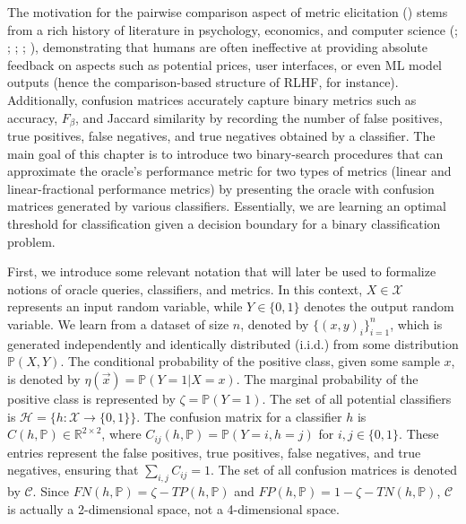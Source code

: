 \documentclass[
  letterpaper,
  numbers=noenddot,
  DIV=11]{scrreprt}
\theoremstyle{plain}
\theoremstyle{definition}
\theoremstyle{remark}
\begin{document}
The motivation for the pairwise comparison aspect of metric elicitation
() stems
from a rich history of literature in psychology, economics, and computer
science (;
; ; ;
), demonstrating that
humans are often ineffective at providing absolute feedback on aspects
such as potential prices, user interfaces, or even ML model outputs
(hence the comparison-based structure of RLHF, for instance).
Additionally, confusion matrices accurately capture binary metrics such
as accuracy, \(F_\beta\), and Jaccard similarity by recording the number
of false positives, true positives, false negatives, and true negatives
obtained by a classifier. The main goal of this chapter is to introduce
two binary-search procedures that can approximate the oracle's
performance metric for two types of metrics (linear and
linear-fractional performance metrics) by presenting the oracle with
confusion matrices generated by various classifiers. Essentially, we are
learning an optimal threshold for classification given a decision
boundary for a binary classification problem.

First, we introduce some relevant notation that will later be used to
formalize notions of oracle queries, classifiers, and metrics. In this
context, \(X \in \mathcal{X}\) represents an input random variable,
while \(Y \in \{0, 1\}\) denotes the output random variable. We learn
from a dataset of size \(n\), denoted by \(\{(x, y)_i\}^n_{i=1}\), which
is generated independently and identically distributed (i.i.d.) from
some distribution \(\mathbb{P}(X, Y)\). The conditional probability of
the positive class, given some sample \(x\), is denoted by
\(\eta(\vec{x}) = \mathbb{P}(Y=1 | X=x)\). The marginal probability of
the positive class is represented by \(\zeta = \mathbb{P}(Y=1)\). The
set of all potential classifiers is
\(\mathcal{H} = \{h : \mathcal{X} \rightarrow \{0,1\}\}\). The confusion
matrix for a classifier \(h\) is
\(C(h, \mathbb{P}) \in \mathbb{R}^{2 \times 2}\), where
\(C_{ij}(h, \mathbb{P}) = \mathbb{P}(Y=i, h=j)\) for
\(i, j \in \{0,1\}\). These entries represent the false positives, true
positives, false negatives, and true negatives, ensuring that
\(\sum_{i,j}C_{ij}=1\). The set of all confusion matrices is denoted by
\(\mathcal{C}\). Since \(FN(h, \mathbb{P}) = \zeta - TP(h, \mathbb{P})\)
and \(FP(h, \mathbb{P}) = 1 - \zeta - TN(h, \mathbb{P})\),
\(\mathcal{C}\) is actually a 2-dimensional space, not a 4-dimensional
space.
\end{document}
